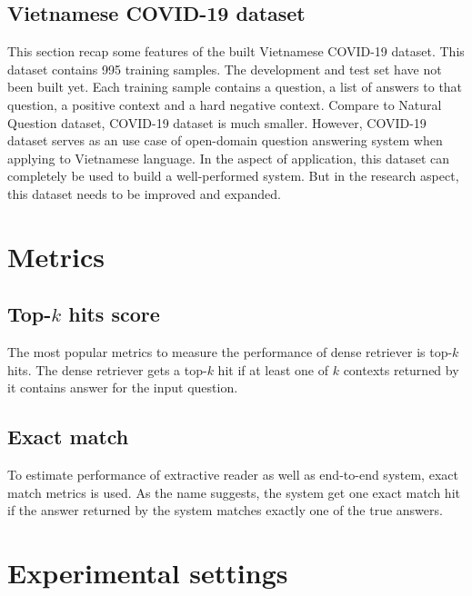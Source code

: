\documentclass[12pt, sort&compress]{report}
\begin{document}
\subsection{Vietnamese COVID-19 dataset}
\label{sec:4.1.2}
This section recap some features of the built Vietnamese COVID-19 dataset. This dataset contains 995 training samples. The development and test set have not been built yet. Each training sample contains a question, a list of answers to that question, a positive context and a hard negative context. Compare to Natural Question dataset, COVID-19 dataset is much smaller. However, COVID-19 dataset serves as an use case of open-domain question answering system when applying to Vietnamese language. In the aspect of application, this dataset can completely be used to build a well-performed system. But in the research aspect, this dataset needs to be improved and expanded. 
\section{Metrics}
\label{sec:4.2}
\subsection{Top-$k$ hits score}
\label{sec:4.2.1}
The most popular metrics to measure the performance of dense retriever is top-$k$ hits. The dense retriever gets a top-$k$ hit if at least one of $k$ contexts returned by it contains answer for the input question. 
\subsection{Exact match}
\label{sec:4.2.2}
To estimate performance of extractive reader as well as end-to-end system, exact match metrics is used. As the name suggests, the system get one exact match hit if the answer returned by the system matches exactly one of the true answers. 
\section{Experimental settings}
\label{sec:4.3}
\end{document}
